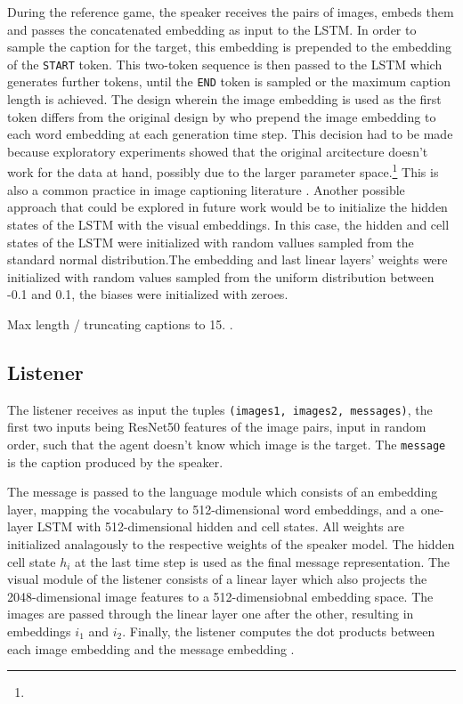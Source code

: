 During the reference game, the speaker receives the pairs of images, embeds them and passes the concatenated embedding as input to the LSTM. In order to sample the caption for the target, this embedding is prepended to the embedding of  the \texttt{START} token. This two-token sequence is then passed to the LSTM which generates further tokens, until the \texttt{END} token is sampled or the maximum caption length is achieved. The design wherein the image embedding is used as the first token differs from the original design by \textcite{lazaridou2020multi} who prepend the image embedding to each word embedding at each generation time step. This decision had to be made because exploratory experiments showed that the original arcitecture doesn't work for the data at hand, possibly due to the larger parameter space.\footnote{} This is also a common practice in image captioning literature . Another possible approach that could be explored in future work would be to initialize the hidden states of the LSTM with the visual embeddings. In this case, the hidden and cell states of the LSTM were initialized with random vallues sampled from the standard normal distribution.The embedding and last linear layers' weights were initialized with random values sampled from the uniform distribution between -0.1 and 0.1, the biases were initialized with zeroes.  

Max length / truncating captions to 15. 
.

\subsection{Listener}
The listener receives as input the tuples \texttt{(images1, images2, messages)}, the first two inputs being ResNet50 features of the image pairs, input in random order, such that the agent doesn't know which image is the target. The \texttt{message} is the caption produced by the speaker. 

The message is passed to the language module which consists of an embedding layer, mapping the vocabulary to 512-dimensional word embeddings, and a one-layer LSTM with 512-dimensional hidden and cell states. All weights are initialized analagously to the respective weights of the speaker model. The hidden cell state $h_i$ at the last time step is used as the final message representation. 
The visual module of the listener consists of a linear layer which also projects the 2048-dimensional image features to a 512-dimensiobnal embedding space. The images are passed through the linear layer one after the other, resulting in embeddings $i_1$ and $i_2$. Finally, the listener computes the dot products between each image embedding and the message embedding . 

